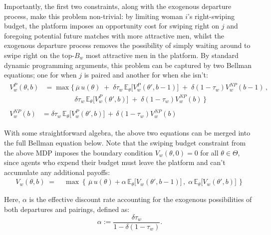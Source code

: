Importantly, the first two constraints, along with the exogenous departure process, make this problem non-trivial: by limiting woman $i$'s right-swiping budget, the platform imposes an opportunity cost for swiping right on $j$ and foregoing potential future matches with more attractive men, whilst the exogenous departure process removes the possibility of simply waiting around to swipe right on the top-$B_w$ most attractive men in the platform. 
By standard dynamic programming arguments, this problem can be captured by two Bellman equations; one for when $j$ is paired and another for when she isn't: 
\begin{align}
    \begin{split} 
        V^{P}_w(\theta,b) &=\max \Big\{ \, \overline{\mu}\, u(\theta) \;+\; \delta \tau_w \,\mathbb{E}_\theta \Big[V^P_w(\theta', b-1)\Big] \;+\; \delta (1-\tau_w)V^{NP}_w(b-1) \, ,\\[6pt]
        & \quad\quad\quad\quad\;\delta \tau_w \, \mathbb{E}_\theta\Big[ V^P_w(\theta', b) \Big] \;+\; \delta (1-\tau_w) V^{NP}_w(b) \, \Big\}
    \end{split}\\[10pt]
    \begin{split}
        V^{NP}_w(b) &= {}\delta \tau_w \,\mathbb{E}_\theta \Big[ V^P_w(\theta', b)\Big] \,+\, \delta (1-\tau_w) V^{NP}_w(b)
    \end{split} 
\end{align} 

With some straightforward algebra, the above two equations can be merged into the full Bellman equation below. Note that the swiping budget constraint from the above MDP imposes the boundary condition $V_w(\theta, 0)=0$ for all $\theta \in \Theta$, since agents who expend their budget must leave the platform and can't accumulate any additional payoffs: 
\begin{equation}\label{eq:full bellman}
    \begin{aligned} 
        V_w(\theta,b) \;=\;&\max\left\{\,\overline{\mu} \, u(\theta) +\alpha \,\mathbb{E}_\theta \Big[V_w(\theta', b-1)\Big]\,,\; \alpha\,\mathbb{E}_\theta \Big[ V_w(\theta', b)\Big]\,\right\}
    \end{aligned}
\end{equation}

Here, $\alpha$ is the effective discount rate accounting for the exogenous possibilities of both departures and pairings, defined as:  
\begin{equation*}
\alpha:=\frac{\delta \tau_w}{1-\delta(1-\tau_w)}.
\end{equation*}

